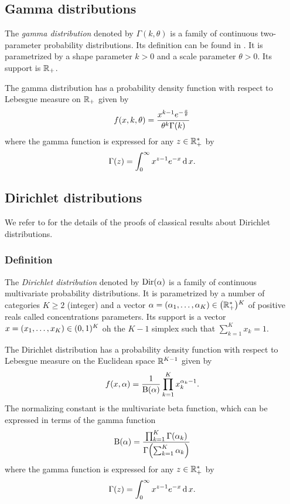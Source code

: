 \subsection{Gamma distributions}

The \emph{gamma distribution} denoted by $\Gamma(k,\theta)$ is a family of continuous two-parameter probability distributions.
Its definition can be found in \cite[Appendix A]{Delmas2006}.
It is parametrized by a shape parameter $k>0$ and a scale parameter $\theta>0$.
Its support is $\mathbb{R}_+$.

The gamma distribution has a probability density function with respect to Lebesgue measure on $\mathbb{R}_+$ given by
\begin{equation}\label{eq:dirchlet:probability-density-function}
  f\bracket{x,k,\theta} = \frac{x^{k-1}e^{-\frac{x}{\theta}}}{ \theta^k\Gamma\bracket{k} }
\end{equation}
where the gamma function is expressed for any $z\in\mathbb{R}_+^*$ by
\begin{equation}
  \Gamma\bracket{z} = \int_0^{\infty} x^{z-1}e^{-x} \diff x.
\end{equation}


\subsection{Dirichlet distributions}

We refer to \cite[Chapter 49]{Kotz2000} for the details of the proofs of classical results about Dirichlet distributions.


\subsubsection{Definition}


The \emph{Dirichlet distribution} denoted by $\operatorname{Dir}(\alpha)$ is a family of continuous multivariate probability distributions.
It is parametrized by a number of categories $K \ge 2$ (integer) and a vector $\alpha=\bracket{\alpha_1,\ldots,\alpha_K}\in\bracket{\RR_+^*}^K$ of positive reals called concentrations parameters.
Its support is a vector $x=\bracket{x_1,\ldots,x_K}\in\bracket{0,1}^K$ oh the $K-1$ simplex \ie such that $\sum_{k=1}^K x_k = 1$.

The Dirichlet distribution has a probability density function with respect to Lebesgue measure on the Euclidean space $\mathbb{R}^{K-1}$ given by
\begin{equation}\label{eq:dirchlet:probability-density-function}
  f\bracket{x,\alpha} = \frac{1}{ \Beta\bracket{\alpha}}\prod_{k=1}^K x_k^{\alpha_k-1}.
\end{equation}
The normalizing constant is the multivariate beta function, which can be expressed in terms of the gamma function
\begin{equation}
  \Beta\bracket{\alpha} =
  \frac{ \prod_{k=1}^K \Gamma\bracket{\alpha_k} }
       { \Gamma\bracket{\sum_{k=1}^K \alpha_k} }
\end{equation}
where the gamma function is expressed for any $z\in\mathbb{R}_+^*$ by
\begin{equation}
  \Gamma\bracket{z} = \int_0^{\infty} x^{z-1}e^{-x} \diff x.
\end{equation}


